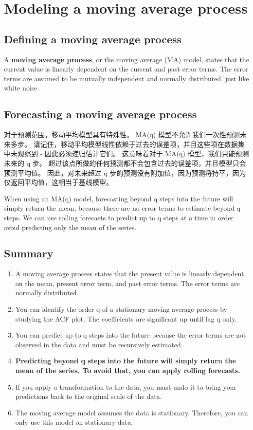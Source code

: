 \chapter{Modeling a moving average process\label{ch04}}
\section{Defining a moving average process}
A \textbf{moving average process}, or the moving average (MA) model, states that the current value is linearly dependent on the current and past error terms. The error terms are assumed to be mutually independent and normally distributed, just like white noise.
\section{Forecasting a moving average process}
对于预测范围，移动平均模型具有特殊性。 MA(q) 模型不允许我们一次性预测未来多步。 请记住，移动平均模型线性依赖于过去的误差项，并且这些项在数据集中未观察到 - 因此必须递归估计它们。 这意味着对于 MA(q) 模型，我们只能预测未来的 q 步。 超过该点所做的任何预测都不会包含过去的误差项，并且模型只会预测平均值。 因此，对未来超过 q 步的预测没有附加值，因为预测将持平，因为仅返回平均值，这相当于基线模型。
\begin{tcolorbox}[title=Forecasting using the MA(q) model]
    When using an MA(q) model, forecasting beyond q steps into the future will simply return the mean, because there are no error terms to estimate beyond q steps. We can use rolling forecasts to predict up to q steps at a time in order avoid predicting only the mean of the series.
\end{tcolorbox}
\section*{Summary}
\begin{enumerate}
    \item A moving average process states that the present value is linearly dependent on the mean, present error term, and past error terms. The error terms are normally distributed.
    \item You can identify the order q of a stationary moving average process by studying the ACF plot. The coefficients are significant up until lag q only.
    \item You can predict up to q steps into the future because the error terms are not observed in the data and must be recursively estimated.
    \item \textbf{Predicting beyond q steps into the future will simply return the mean of the series. To avoid that, you can apply rolling forecasts.}
    \item If you apply a transformation to the data, you must undo it to bring your predictions back to the original scale of the data.
    \item The moving average model assumes the data is stationary. Therefore, you can only use this model on stationary data.
\end{enumerate}